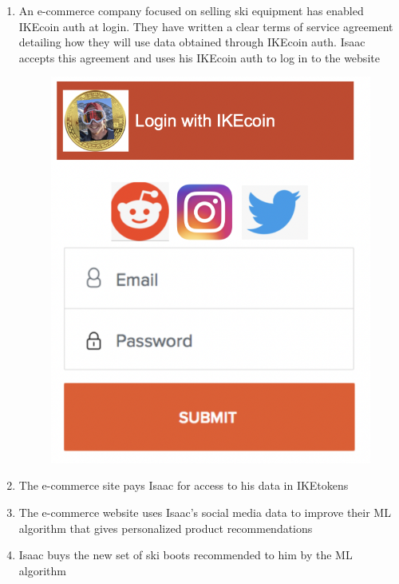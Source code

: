 \documentclass[12pt, letterpaper, twoside]{article}
\begin{document}
\begin{enumerate}
\item An e-commerce company focused on selling ski equipment has enabled IKEcoin auth at login. They have written a clear terms of service agreement detailing how they will use data obtained through IKEcoin auth. Isaac accepts this agreement and uses his IKEcoin auth to log in to the website 
\begin{figure}[h]
\includegraphics[scale=0.3]{media/IKEcoinLogin.jpg}
\centering
\end{figure}
    
\item The e-commerce site pays Isaac for access to his data  in IKEtokens
    
\item The e-commerce website uses Isaac's social media data to improve their ML algorithm that gives personalized product recommendations 
    
\item Isaac buys the new set of ski boots recommended to him by the ML algorithm    
\end{enumerate}
\end{document}
